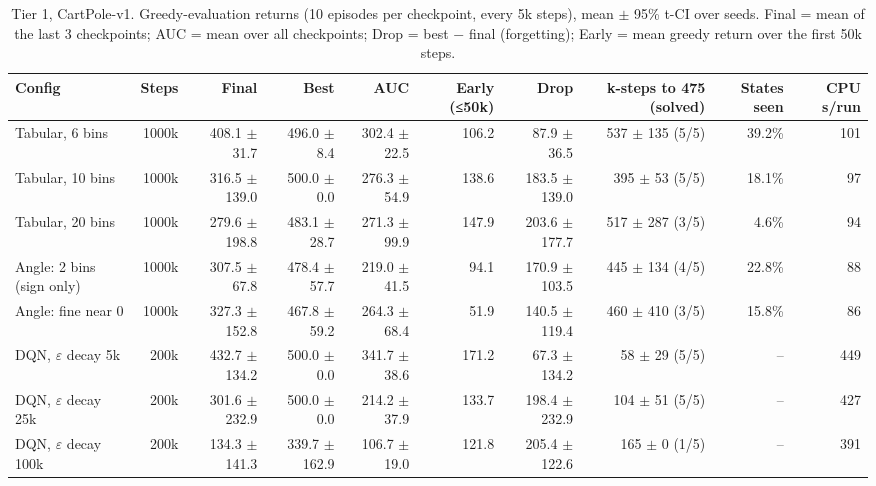 \begin{table}[t]
\centering\small
\caption{Tier 1, CartPole-v1. Greedy-evaluation returns (10 episodes per checkpoint, every 5k steps), mean $\pm$ 95\% t-CI over seeds. Final = mean of the last 3 checkpoints; AUC = mean over all checkpoints; Drop = best $-$ final (forgetting); Early = mean greedy return over the first 50k steps.}
\label{tab:t1_cartpole}
\begin{tabular}{lrrrrrrrrr}
\toprule
Config & Steps & Final & Best & AUC & Early (≤50k) & Drop & k-steps to 475 (solved) & States seen & CPU s/run \\
\midrule
Tabular, 6 bins & 1000k & 408.1 $\pm$ 31.7 & 496.0 $\pm$ 8.4 & 302.4 $\pm$ 22.5 & 106.2 & 87.9 $\pm$ 36.5 & 537 $\pm$ 135 (5/5) & 39.2\% & 101 \\
Tabular, 10 bins & 1000k & 316.5 $\pm$ 139.0 & 500.0 $\pm$ 0.0 & 276.3 $\pm$ 54.9 & 138.6 & 183.5 $\pm$ 139.0 & 395 $\pm$ 53 (5/5) & 18.1\% & 97 \\
Tabular, 20 bins & 1000k & 279.6 $\pm$ 198.8 & 483.1 $\pm$ 28.7 & 271.3 $\pm$ 99.9 & 147.9 & 203.6 $\pm$ 177.7 & 517 $\pm$ 287 (3/5) & 4.6\% & 94 \\
Angle: 2 bins (sign only) & 1000k & 307.5 $\pm$ 67.8 & 478.4 $\pm$ 57.7 & 219.0 $\pm$ 41.5 & 94.1 & 170.9 $\pm$ 103.5 & 445 $\pm$ 134 (4/5) & 22.8\% & 88 \\
Angle: fine near 0 & 1000k & 327.3 $\pm$ 152.8 & 467.8 $\pm$ 59.2 & 264.3 $\pm$ 68.4 & 51.9 & 140.5 $\pm$ 119.4 & 460 $\pm$ 410 (3/5) & 15.8\% & 86 \\
DQN, $\varepsilon$ decay 5k & 200k & 432.7 $\pm$ 134.2 & 500.0 $\pm$ 0.0 & 341.7 $\pm$ 38.6 & 171.2 & 67.3 $\pm$ 134.2 & 58 $\pm$ 29 (5/5) & -- & 449 \\
DQN, $\varepsilon$ decay 25k & 200k & 301.6 $\pm$ 232.9 & 500.0 $\pm$ 0.0 & 214.2 $\pm$ 37.9 & 133.7 & 198.4 $\pm$ 232.9 & 104 $\pm$ 51 (5/5) & -- & 427 \\
DQN, $\varepsilon$ decay 100k & 200k & 134.3 $\pm$ 141.3 & 339.7 $\pm$ 162.9 & 106.7 $\pm$ 19.0 & 121.8 & 205.4 $\pm$ 122.6 & 165 $\pm$ 0 (1/5) & -- & 391 \\
\bottomrule
\end{tabular}
\end{table}
